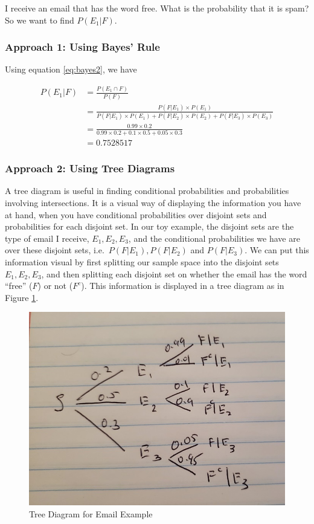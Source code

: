 \documentclass[
]{book}
\begin{document}
I receive an email that has the word free. What is the probability that it is spam? So we want to find \(P(E_1|F)\).

\subsubsection{Approach 1: Using Bayes' Rule}\label{approach-1-using-bayes-rule}

Using equation \eqref{eq:bayes2}, we have

\[
\begin{split}
P(E_1|F) &= \frac{P(E_1 \cap F)}{P(F)}\\
 &= \frac{P(F|E_1) \times P(E_1)}{P(F|E_1) \times P(E_1) + P(F|E_2) \times P(E_2) + P(F|E_3) \times P(E_3)} \\
&= \frac{0.99 \times 0.2}{0.99 \times 0.2 + 0.1 \times 0.5 + 0.05 \times 0.3}\\
&= 0.7528517
\end{split}
\]

\subsubsection{Approach 2: Using Tree Diagrams}\label{approach-2-using-tree-diagrams}

A tree diagram is useful in finding conditional probabilities and probabilities involving intersections. It is a visual way of displaying the information you have at hand, when you have conditional probabilities over disjoint sets and probabilities for each disjoint set. In our toy example, the disjoint sets are the type of email I receive, \(E_1, E_2, E_3\), and the conditional probabilities we have are over these disjoint sets, i.e.~\(P(F|E_1), P(F|E_2)\) and \(P(F|E_3)\). We can put this information visual by first splitting our sample space into the disjoint sets \(E_1, E_2, E_3\), and then splitting each disjoint set on whether the email has the word ``free'' (\(F\)) or not (\(F^c\)). This information is displayed in a tree diagram as in Figure \ref{fig:tree}.

\begin{figure}
\centering
\includegraphics{images/02-tree.jpg}
\caption{\label{fig:tree}Tree Diagram for Email Example}
\end{figure}
\end{document}

